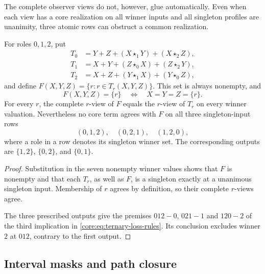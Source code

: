 








The complete observer views do not, however, glue automatically. Even
when each view has a core realization on all winner inputs and all singleton
profiles are unanimity, three atomic rows can obstruct a common realization.

\begin{proposition}
\label{core:prop:observer-amalgamation}
For roles $0,1,2$, put
\begin{align*}
 T_0&=Y+Z+(X\star_1Y)+(X\star_2Z),\\
 T_1&=X+Y+(Z\star_0X)+(Z\star_2Y),\\
 T_2&=X+Z+(Y\star_1X)+(Y\star_0Z),
\end{align*}
and define $F(X,Y,Z)=\{r:r\in T_r(X,Y,Z)\}$. This set is always
nonempty, and
\[
 F(X,Y,Z)=\{r\}\quad\Longleftrightarrow\quad X=Y=Z=\{r\}.
\]
For every $r$, the complete $r$-view of $F$ equals the $r$-view of $T_r$
on every winner valuation. Nevertheless no core term agrees with $F$ on
all three singleton-input rows
\[
 (0,1,2),\quad(0,2,1),\quad(1,2,0),
\]
where a role in a row denotes its singleton winner set. The corresponding
outputs are $\{1,2\}$, $\{0,2\}$, and $\{0,1\}$.
\end{proposition}
\begin{proof}
Substitution in the seven nonempty winner values shows that $F$ is
nonempty and that each $T_r$, as well as $F$, is a singleton exactly at a
unanimous singleton input. Membership of $r$ agrees by definition, so their
complete $r$-views agree.

The three prescribed outputs give the premises $012-0$, $021-1$ and
$120-2$ of the third implication in \eqref{core:eq:ternary-loss-rules}.
Its conclusion excludes winner $2$ at $012$, contrary to the first output.
\end{proof}

\subsection{Interval masks and path closure}
\label{app:core-interval-masks}

